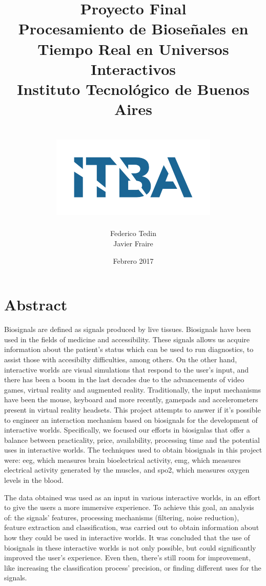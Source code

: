 \documentclass[a4paper]{report}
\title{
	{\LARGE Proyecto Final}\\
	{\Huge Procesamiento de Bioseñales en Tiempo Real en Universos Interactivos}\\
	{\large Instituto Tecnológico de Buenos Aires}\\~\\
	{\includegraphics{itba.png}}
}
\author{{Federico Tedin} \\ {Javier Fraire}}
\date{Febrero 2017}
\begin{document}
\maketitle

\chapter*{Abstract}
\justifying
Biosignals are defined as signals produced by live tissues. Biosignals have been used in the fields of medicine and accessibility. These signals allows us acquire information about the patient's status which can be used to run diagnostics, to assist those with accesibilty difficulties, among others. On the other hand, interactive worlds are visual simulations that respond to the user's input, and there has been a boom in the last decades due to the advancements of video games, virtual reality and augmented reality.  Traditionally, the input mechanisms have been the mouse, keyboard and more recently, gamepads and accelerometers present in virtual reality headsets. This project attempts to answer if it's possible to engineer an interaction mechanism based on biosignals for the development of interactive worlds. Specifically, we focused our efforts in biosignlas that offer a balance between practicality, price, availability, processing time and the potential uses in interactive worlds. The techniques used to obtain biosignals in this project were: \acrshort{eeg}, which measures brain bioelectrical activity, \acrshort{emg}, which measures electrical activity generated by the muscles, and \acrshort{spo2}, which measures oxygen levels in the blood.

The data obtained was used as an input in various interactive worlds, in an effort to give the users a more immersive experience. To achieve this goal, an analysis of: the signals' features, processing mechanisms (filtering, noise reduction), feature extraction and classification, was carried out to obtain information about how they could be used in interactive worlds.  It was concluded that the use of biosignals in these interactive worlds is not only possible, but could significantly improved the user's experience. Even then, there's still room for improvement, like increasing the classification process' precision, or finding different uses for the signals.
\end{document}
